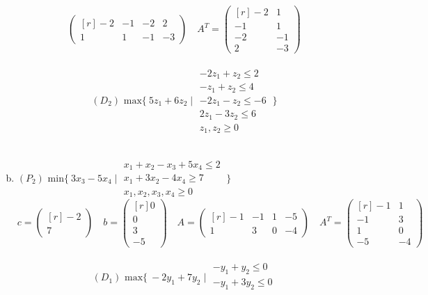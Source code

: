 \documentclass[a4paper,10pt]{article}
\begin{document}
\begin{enumerate}[a)]
\[\begin{pmatrix*}[r]
	-2 & -1 & -2 & 2\\
	1 & 1 & -1 & -3
	\end{pmatrix*}
	\quad
	A^T =
	\begin{pmatrix*}[r]
	-2 & 1\\
	-1 & 1\\
	-2 & -1\\
	2 & -3
	\end{pmatrix*}
	\]
	\ \\
	\[
	(D_2) \text{ max} \{\ 5z_1 + 6z_2 \mid 
	\begin{matrix}
		-2z_1 + z_2 \leq 2\\
		-z_1 + z_2 \leq 4\\
		-2z_1 - z_2 \leq -6\\
		2z_1 - 3z_2 \leq 6\\
		z_1, z_2 \geq 0
	\end{matrix}
	\ \}
	\]
	\ \\
	\item 
	$(P_2) \text{ min} \{\ 3x_3 - 5x_4 \mid 
	\begin{matrix}
		x_1 + x_2 - x_3 + 5x_4 \leq 2\\
		x_1 + 3x_2 -4x_4 \geq 7\\
		x_1, x_2, x_3, x_4 \geq 0
	\end{matrix}
	\ \}$
	\\
	\[
	c = 
	\begin{pmatrix*}[r]
		-2\\
		7
	\end{pmatrix*}
	\quad
	b = 
	\begin{pmatrix*}[r]
		0\\
		0\\
		3\\
		-5
	\end{pmatrix*}
	\quad
	A =
	\begin{pmatrix*}[r]
		-1 & -1 & 1 & -5\\
		1 & 3 & 0 & -4
	\end{pmatrix*}
	\quad
	A^T = 
	\begin{pmatrix*}[r]
		-1 & 1\\
		-1 & 3\\
		1  & 0\\
		-5 & -4
	\end{pmatrix*}
	\]
	\ \\
	\[
	(D_1) \text{ max} \{\ -2y_1 + 7y_2 \mid 
	\begin{matrix}
		-y_1 + y_2 \leq 0\\
		-y_1 + 3y_2 \leq 0\\

\end{matrix}\]
\end{enumerate}
\end{document}
